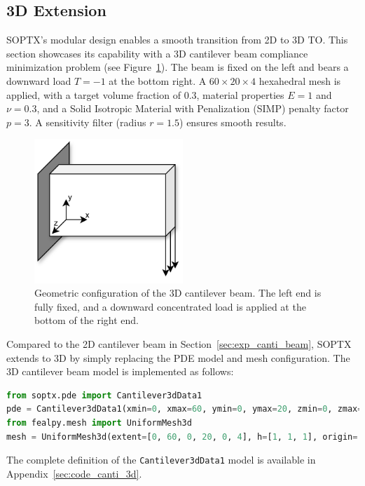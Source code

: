 \documentclass[mathpazo]{cicp}
\begin{document}
\subsection{3D Extension}\label{sec:exp_canti3d}
SOPTX’s modular design enables a smooth transition from 2D to 3D TO. This section showcases its capability with a 3D cantilever beam compliance minimization problem (see Figure~\ref{fig:cantilever_3d}). The beam is fixed on the left and bears a downward load $T=-1$ at the bottom right. A $60\times20\times4$ hexahedral mesh is applied, with a target volume fraction of 0.3, material properties $E=1$ and $\nu=0.3$, and a Solid Isotropic Material with Penalization (SIMP) penalty factor $p=3$. A sensitivity filter (radius $r=1.5$) ensures smooth results.
\vspace{-2ex} %
\begin{figure}[htp]
	\centering
	\includegraphics[width=0.5\textwidth]{figures/cantilever_3d.png}
	\caption{Geometric configuration of the 3D cantilever beam. The left end is fully fixed, and a downward concentrated load is applied at the bottom of the right end.}
	\label{fig:cantilever_3d}
\end{figure}
\vspace{-2ex} %

Compared to the 2D cantilever beam in Section~\ref{sec:exp_canti_beam}, SOPTX extends to 3D by simply replacing the PDE model and mesh configuration. The 3D cantilever beam model is implemented as follows:
\vspace{-0.5ex} %
\begin{lstlisting}[language=python]
from soptx.pde import Cantilever3dData1
pde = Cantilever3dData1(xmin=0, xmax=60, ymin=0, ymax=20, zmin=0, zmax=4, T=-1)
from fealpy.mesh import UniformMesh3d
mesh = UniformMesh3d(extent=[0, 60, 0, 20, 0, 4], h=[1, 1, 1], origin=[0, 0, 0])
\end{lstlisting}
\vspace{-0.5ex} %
The complete definition of the \texttt{Cantilever3dData1} model is available in Appendix~\ref{sec:code_canti_3d}.
\end{document}
